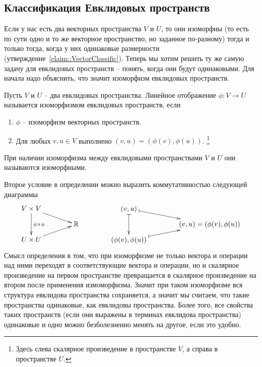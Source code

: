 \subsection{Классификация Евклидовых пространств}

Если у нас есть два векторных пространства $V$ и $U$, то они изоморфны (то есть по сути одно и то же векторное пространство, но заданное по-разному) тогда и только тогда, когда у них одинаковые размерности (утверждение~\ref{claim::VectorClassific}).
Теперь мы хотим решить ту же самую задачу для евклидовых пространств -- понять, когда они будут одинаковыми.
Для начала надо объяснить, что значит изоморфизм евклидовых пространств.

\begin{definition}
Пусть $V$ и $U$ -- два евклидовых пространства.
Линейное отображение $\phi\colon V\to U$ называется изоморфизмом евклидовых пространств, если
\begin{enumerate}
\item $\phi$ -- изоморфизм векторных пространств.

\item Для любых $v,u\in V$ выполнено $(v, u) = (\phi(v), \phi(u))$.%
\footnote{Здесь слева скалярное произведение в пространстве $V$, а справа в пространстве $U$.}
\end{enumerate}
При наличии изоморфизма между евклидовыми пространствами $V$ и $U$ они называются изоморфными.
\end{definition}

Второе условие в определении можно выразить коммутативностью следующей диаграммы
\[
\xymatrix@R=6pt@C=40pt{
	{V\times V}\ar[dd]^{\phi\times \phi}\ar[rd]&{}&{(v,u)}\ar@{|->}[dd]\ar@{|->}[rd]&{}\\
	{}&{\mathbb R}&{}&{(v,u) = (\phi(v),\phi(u))}\\
	{U\times U}\ar[ru]&{}&{(\phi(v),\phi(u))}\ar@{|->}[ru]&{}
}
\]
Смысл определения в том, что при изоморфизме не только вектора и операции над ними переходят в соответствующие вектора и операции, но и скалярное произведение на первом пространстве превращается в скалярное произведение на втором после применения измоморфизма.
Значит при таком изоморфизме вся структура евклидова пространства сохраняется, а значит мы считаем, что такие пространства одинаковые, как евклидовы пространства.
Более того, все свойства таких пространств (если они выражены в терминах евклидова пространства) одинаковые и одно можно безболезненно менять на другое, если это удобно.


